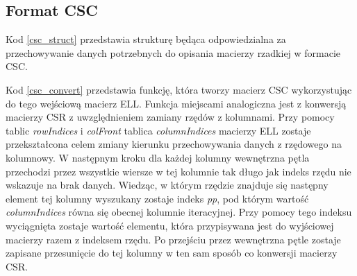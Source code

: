 \subsection{Format CSC}
\label{cha:csc_impl}

Kod \ref{csc_struct} przedstawia strukturę będąca odpowiedzialna za przechowywanie danych potrzebnych do opisania macierzy rzadkiej w formacie CSC.


Kod \ref{csc_convert} przedstawia funkcję, która tworzy macierz CSC wykorzystując do tego wejściową macierz ELL.
Funkcja miejscami analogiczna jest z konwersją macierzy CSR z uwzględnieniem zamiany rzędów z kolumnami.
Przy pomocy tablic \textit{rowIndices} i \textit{colFront} tablica \textit{columnIndices} macierzy ELL zostaje przekształcona celem zmiany kierunku przechowywania danych z rzędowego na kolumnowy.
W następnym kroku dla każdej kolumny wewnętrzna pętla przechodzi przez wszystkie wiersze w tej kolumnie tak długo jak indeks rzędu nie wskazuje na brak danych.
Wiedząc, w którym rzędzie znajduje się następny element tej kolumny wyszukany zostaje indeks \textit{pp}, pod którym wartość \textit{columnIndices} równa się obecnej kolumnie iteracyjnej.
Przy pomocy tego indeksu wyciągnięta zostaje wartość elementu, która przypisywana jest do wyjściowej macierzy razem z indeksem rzędu.
Po przejściu przez wewnętrzna pętle zostaje zapisane przesunięcie do tej kolumny w ten sam sposób co konwersji macierzy CSR.

